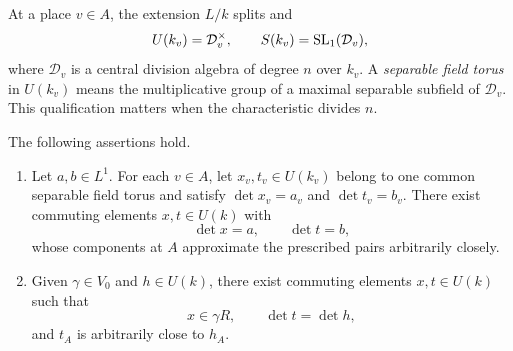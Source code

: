 At a place $v\in A$, the extension $L/k$ splits and
\[
 U(k_v)=\mathcal D_v^\times,
 \qquad S(k_v)=\operatorname{SL}_1(\mathcal D_v),
\]
where $\mathcal D_v$ is a central division algebra of degree $n$ over
$k_v$.  A \emph{separable field torus} in $U(k_v)$ means the
multiplicative group of a maximal separable subfield of $\mathcal D_v$.
This qualification matters when the characteristic divides $n$.

\begin{proposition}\label{quo:commuting}
The following assertions hold.
\begin{enumerate}
 \item Let $a,b\in L^1$.  For each $v\in A$, let $x_v,t_v\in U(k_v)$
 belong to one common separable field torus and satisfy
 $\det x_v=a_v$ and $\det t_v=b_v$.
 There exist commuting elements $x,t\in U(k)$ with
 \[
  \det x=a,\qquad \det t=b,
 \]
 whose components at $A$ approximate the prescribed pairs arbitrarily
 closely.
 \item Given $\gamma\in V_0$ and $h\in U(k)$, there exist commuting
 elements $x,t\in U(k)$ such that
 \[
  x\in\gamma R,\qquad \det t=\det h,
 \]
 and $t_A$ is arbitrarily close to $h_A$.
\end{enumerate}
\end{proposition}

